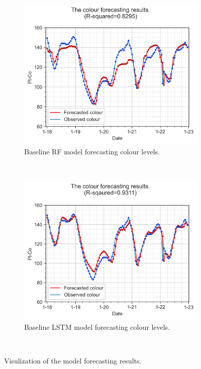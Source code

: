 \begin{figure}[!ht]
  \centering
    \begin{subfigure}[t]{0.75\textwidth}
      \includegraphics[width=\linewidth]{imgs/results/ammonia-colour-forecast-plot/00-RF_1_pred_Step1-obs-colour.png}
      \caption{Baseline RF model forecasting colour levels.} \label{fig:baseline-colour-plot-rf}
    \end{subfigure}\\ 
    \vspace{1em}%
    \begin{subfigure}[t]{0.75\textwidth}
      \includegraphics[width=\linewidth]{imgs/results/ammonia-colour-forecast-plot/00-LSTM_1_pred_Step1-obs-colour.png}
      \caption{Baseline LSTM model forecasting colour levels.} \label{fig:baseline-colour-plot-lstm}
    \end{subfigure}\\
  \caption{Visulization of the model forecasting results.} \label{fig:baseline-plot-colour}
\end{figure}


